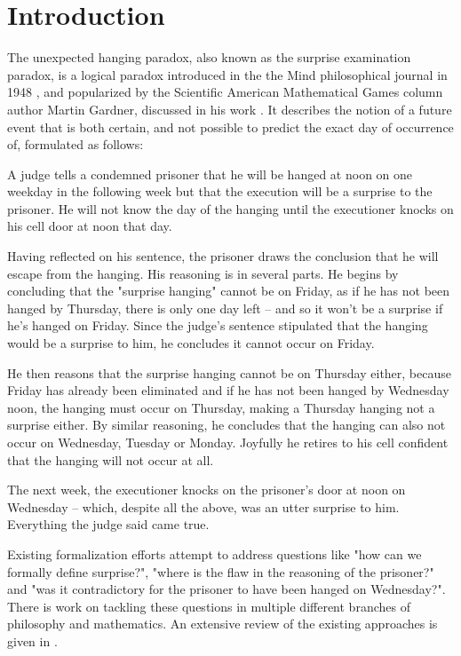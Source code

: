 \documentclass[runningheads]{llncs}
\newenvironment{myindent}{\begin{adjustwidth}{1cm}{}}{\end{adjustwidth}}
\begin{document}
\section{Introduction}

The unexpected hanging paradox, also known as the surprise examination paradox,
is a logical paradox introduced in the the Mind philosophical journal in 1948 \cite{original},
and popularized by the Scientific American Mathematical
Games column author Martin Gardner, discussed in his work \cite{diversions}.
It describes the notion of a future event that
is both certain, and not possible to predict the exact day of occurrence of,
formulated as follows:

\begin{myindent}
  A judge tells a condemned prisoner that he will be hanged at noon on one weekday
  in the following week but that the execution will be a surprise to the prisoner.
  He will not know the day of the hanging until the executioner knocks on his cell door at noon that day.

  Having reflected on his sentence, the prisoner draws the conclusion that he will
  escape from the hanging. His reasoning is in several parts. He begins by concluding
  that the "surprise hanging" cannot be on Friday, as if he has not been hanged by
  Thursday, there is only one day left – and so it won't be a surprise if he's hanged on
  Friday. Since the judge's sentence stipulated that the hanging would be a surprise
  to him, he concludes it cannot occur on Friday.

  He then reasons that the surprise hanging cannot be on Thursday either, because
  Friday has already been eliminated and if he has not been hanged by Wednesday noon,
  the hanging must occur on Thursday, making a Thursday hanging not a surprise either.
  By similar reasoning, he concludes that the hanging can also not occur on Wednesday,
  Tuesday or Monday. Joyfully he retires to his cell confident that the hanging will
  not occur at all.

  The next week, the executioner knocks on the prisoner's door at noon on Wednesday –
  which, despite all the above, was an utter surprise to him. Everything the judge said came true.
\end{myindent}

Existing formalization efforts attempt to address questions like "how can we formally
define surprise?", "where is the flaw in the
reasoning of the prisoner?" and "was it contradictory for the prisoner to have been
hanged on Wednesday?". There is work on tackling these questions in multiple
different branches of philosophy and mathematics.
An extensive review of the existing approaches is given in \cite{extensivereview}.
\end{document}
